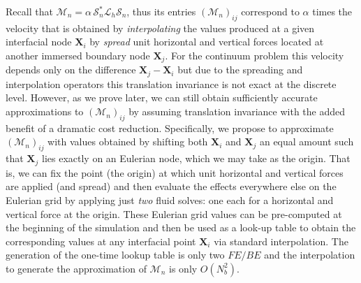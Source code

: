 \documentclass[preprint,12pt]{elsarticle}
\begin{document}
Recall that $\mathcal{M}_n =  \alpha \,  \mathcal{S}^*_n \mathcal{L}_h \mathcal{S}_n$, thus its entries  $(\mathcal{M}_n)_{ij}$ 
correspond to $\alpha$ times  the velocity that is obtained by {\em interpolating}  
the values produced at a given interfacial node $\mathbf{X}_i$ by  {\em spread} unit horizontal and vertical forces located at another immersed boundary node  $\mathbf{X}_j$. For the continuum  problem this velocity depends only on the difference 
$\mathbf{X}_j - \mathbf{X}_i$ but due to the spreading and interpolation operators this translation invariance is not exact at the discrete level. However, as we prove later, we can still obtain sufficiently accurate approximations to  $(\mathcal{M}_n)_{ij}$  by assuming translation invariance with the added benefit of a dramatic cost reduction.
Specifically, we propose to approximate $(\mathcal{M}_n)_{ij}$  with values obtained  by shifting both $\mathbf{X}_i$ and $\mathbf{X}_j$ an equal amount such that $\mathbf{X}_j$ lies exactly on an Eulerian node, which we may take as the origin. That is, we can fix the point (the origin) at which unit horizontal and vertical forces are applied (and spread) and then evaluate the effects everywhere else on the Eulerian grid by  applying just {\em two} fluid solves: one each for a horizontal and vertical force at the origin. These Eulerian grid values can be pre-computed at the
beginning of the simulation and then be used as a look-up table to obtain the corresponding values at 
any interfacial point $\mathbf{X}_i$  via standard interpolation. The generation of the one-time lookup table is only two $FE/BE$ and
the interpolation to generate the approximation of  $\mathcal{M}_n$ is only $O(N_b^2)$.
\end{document}
